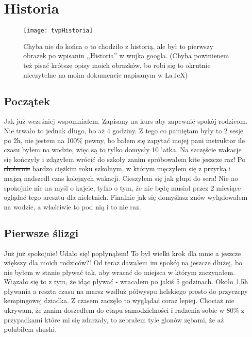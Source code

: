 \documentclass{article}
\begin{document}
	\section{Historia}
	
		\begin{figure}[h]
			\centering
			\texttt{[image: tvpHistoria]}
			\caption{Chyba nie do końca o to chodziło z historią, ale był to pierwszy obrazek po wpisaniu ,,Historia'' w wujka googla. (Chyba powinienem też pisać krótsze opisy moich obrazków, bo robi się to okrutnie nieczytelne na moim dokumencie napisanym w \LaTeX)}
		\end{figure}
	
	\subsection{Początek}
		Jak już wcześniej wspomniałem. Zapisany na kurs aby zapewnić spokój rodzicom. Nie trwało to jednak długo, bo aż 4 godziny. Z tego co pamiętam były to 2 sesje po 2h, nie jestem na 100\% pewny, bo bałem się zapytać mojej pani instruktor ile czasu byłem na wodzie, więc są to tylko domysły 10 latka. Na szczęście wakacje się kończyły i zdążyłem wrócić do szkoły zanim spróbowałem kite jeszcze raz! Po \sout{cholernie} bardzo ciężkim roku szkolnym, w którym męczyłem się z przyrką i majzą nadszedł czas kolejnych wakacji. Cieszyłem się jak głupi do sera! Nie no spokojnie nie na myśl o kajcie, tylko o tym, że nie będę musiał przez 2 miesiące oglądać tego aresztu dla nieletnich. Finalnie jak się domyślasz znów wylądowałem na wodzie, a właściwie to pod nią i to nie raz.
	
	\subsection{Pierwsze ślizgi}
	
		Już już spokojnie! Udało się! popłynąłem! To był wielki krok dla mnie a jeszcze większy dla moich rodziców?! Od teraz dawałem im spokój na jeszcze dłużej, bo nie byłem w stanie pływać tak, aby wracać do miejsca w którym zaczynałem. Wiązało się to z tym, że idąc pływać - wracałem po jakiś 5 godzinach. Około 1,5h pływania a reszta czasu na marsz wzdłuż półwyspu helskiego prosto do przyczepy kempingowej dziadka. Z czasem zaczęło to wyglądać coraz lepiej. Chociaż nie ukrywam, że zanim doszedłem do etapu samodzielności i radzenia sobie w 80\% z przypadkami które mi się zdarzały, to zebrałem tyle glonów zębami, że aż polubiłem shushi. 
	
\end{document}
